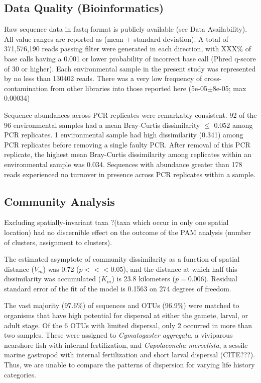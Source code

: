 \documentclass[11pt,letterpaper]{article} %
\begin{document}
\subsection*{Data Quality (Bioinformatics)}
Raw sequence data in fastq format is publicly available (see Data Availability).
All value ranges are reported as (mean $\pm$ standard deviation).
A total of 371,576,190 reads passing filter were generated in each direction, with XXX\% of base calls having a 0.001 or lower probability of incorrect base call (Phred q-score of 30 or higher).
Each environmental sample in the present study was represented by no less than 130402 reads.
There was a very low frequency of cross-contamination from other libraries into those reported here (5e-05$\pm$8e-05; max 0.00034)

Sequence abundances across PCR replicates were remarkably consistent.
92 of the 96 environmental samples had a mean Bray-Curtis dissimilarity $\leq$ 0.052 among PCR replicates.
1 environmental sample had high dissimilarity (0.341) among PCR replicates before removing a single faulty PCR.
After removal of this PCR replicate, the highest mean Bray-Curtis dissimilarity among replicates within an environmental sample was 0.034.
Sequences with abundance greater than 178 reads experienced no turnover in presence across PCR replicates within a sample.

\subsection*{Community Analysis}
Excluding spatially-invariant taxa ?(taxa which occur in only one spatial location) had no discernible effect on the outcome of the PAM analysis (number of clusters, assignment to clusters).

The estimated asymptote of community dissimilarity as a function of spatial distance ($V_m$) was 0.72 ($p <<< 0.05$), and the distance at which half this dissimilarity was accumulated ($K_m$) is 23.8 kilometers ($p = 0.006$).
Residual standard error of the fit of the model is 0.1563 on 274 degrees of freedom.

The vast majority (97.6\%) of sequences and OTUs (96.9\%) were matched to organisms that have high potential for dispersal at either the gamete, larval, or adult stage.
Of the 6 OTUs with limited dispersal, only 2 occurred in more than two samples.
These were assigned to \textit{Cymatogaster aggregata}, a viviparous nearshore fish with internal fertilization, and \textit{Cupolaconcha meroclista}, a sessile marine gastropod with internal fertilization and short larval dispersal (CITE???).
Thus, we are unable to compare the patterns of dispersion for varying life history categories.
\end{document}
